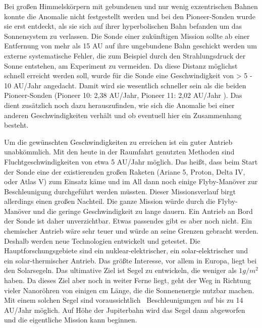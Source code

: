 \bigskip

Bei gro{\ss}en Himmelsk\"orpern mit gebundenen und nur wenig
exzentrischen Bahnen konnte die Anomalie nicht festgestellt werden und
bei den Pioneer-Sonden wurde sie erst ent\-deckt, als sie sich auf
ihrer hyperbolischen Bahn befanden um das Sonnensystem zu ver\-lassen.
Die Sonde einer zuk\"unftigen Mission sollte ab einer Entfernung von
mehr als 15 AU auf ihre ungebundene Bahn geschickt werden um externe
systematische Fehler, die zum Beispiel durch den Strahlungsdruck der
Sonne entstehen, am Experiment zu vermeiden. Da diese Distanz
m\"oglichst schnell erreicht werden soll, wurde f\"ur die Sonde eine
Ge\-schwindigkeit von {\textgreater} 5 - 10 AU/Jahr angedacht. Damit
wird sie wesentlich schneller sein als die beiden Pioneer-Sonden
(Pioneer 10: 2,38 AU/Jahr, Pioneer 11: 2,02 AU/Jahr ). Das dient
zus\"atzlich noch dazu herauszufinden, wie sich die Anomalie bei einer
anderen Ge\-schwindigkeiten verh\"alt und ob eventuell hier ein
Zusammenhang besteht.


\bigskip

Um die gew\"unschten Geschwindigkeiten zu erreichen ist ein guter
Antrieb unabk\"ommlich. Mit den heute in der Raumfahrt genutzten
Methoden sind Fluchtgeschwindigkeiten von etwa 5 AU/Jahr m\"oglich. Das
hei{\ss}t, dass beim Start der Sonde eine der existierenden gro{\ss}en
Raketen (Ariane 5, Proton, Delta IV, oder Atlas V) zum Einsatz k\"ame
und im All dann noch einige Flyby-Man\"over zur Beschleunigung
durchgef\"uhrt werden m\"ussten. Die\-ser Missionsverlauf birgt
allerdings einen gro{\ss}en Nachteil. Die ganze Mission w\"urde durch
die Flyby-Man\"over und die geringe Geschwindigkeit zu lange dauern.
Ein Antrieb an Bord der Sonde ist daher unverzichtbar. Etwas passendes
gibt es aber noch nicht. Ein chemischer Antrieb w\"are sehr teuer und
w\"urde an seine Grenzen gebracht werden. Des\-halb werden neue
Technologien entwickelt und getestet. Die Hauptforschungsgebiete sind
ein nuklear-elektrischer, ein solar-elektrischer und ein
solar-thermischer Antrieb. Das gr\"o{\ss}te Interesse, vor allem in
Europa, liegt bei den Solarsegeln. Das ultimative Ziel ist Se\-gel zu
entwickeln, die weniger als  $1g/m^{2}$ haben. Da dieses Ziel aber noch
in weiter Fer\-ne liegt, geht der Weg in Richtung vieler Nanor\"ohren
von einigen cm L\"ange, die die Son\-nenenergie nutzbar machen. Mit
einem solchen Segel sind voraussichtlich \ Beschleunigun\-gen auf bis
zu 14 AU/Jahr m\"oglich. Auf H\"ohe der Jupiterbahn wird das Segel dann
abge\-worfen und die eigentliche Mission kann beginnen.


